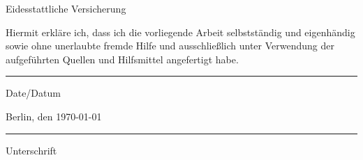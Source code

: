 \begin{titlepage}
\begin{center}{Eidesstattliche Versicherung}
\end{center}
Hiermit erkl\"are ich, dass ich die vorliegende Arbeit selbstst\"andig und 
eigenh\"andig sowie ohne unerlaubte fremde Hilfe und ausschlie\ss{}lich 
unter Verwendung der aufgef\"uhrten Quellen und Hilfsmittel angefertigt habe. 
\vfill
\begin{center}
\noindent
\begin{minipage}{0.5\textwidth}
\begin{flushleft}
\rule{5cm}{0.4pt}
Date/Datum 
\end{flushleft}
\end{minipage}%
\begin{minipage}{0.5\textwidth}
\begin{flushright} 
Berlin, den \today \\
\rule{5cm}{0.4pt}
Unterschrift
\end{flushright}
\end{minipage}


\end{center}
\end{titlepage}